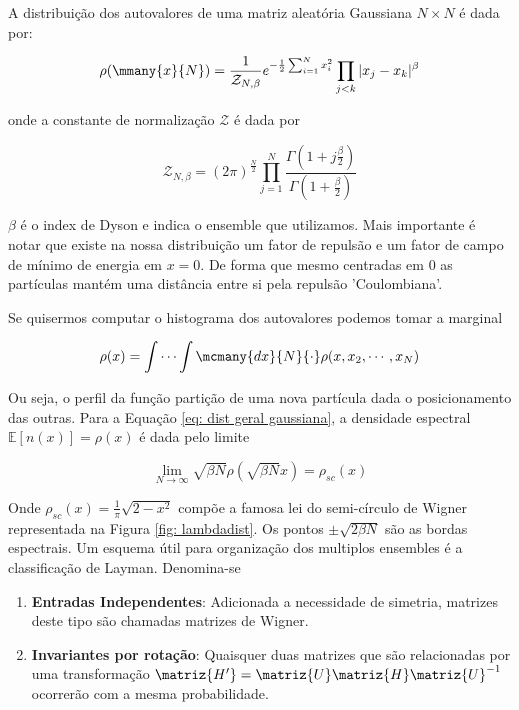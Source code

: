 A distribuição dos autovalores de uma matriz aleatória Gaussiana $N\times N$ é dada por:

\begin{equation}
	\rho(\mmany{x}{N}) = \frac{1}{\mathcal{Z}_{N,\beta}} e^{-\frac{1}{2} \sum_{i=1}^{N} x_i^2} \prod_{j<k} |x_j - x_k|^{\beta}
	\label{eq: dist geral gaussiana}
\end{equation}

onde a constante de normalização $\mathcal{Z}$ é dada por

\begin{equation}
		\mathcal{Z}_{N, \beta} = (2\pi)^{\frac{N}{2}} \prod_{j=1}^{N} \frac{\Gamma (1 + j \frac{\beta}{2})}{\Gamma (1 + \frac{\beta}{2})}
\end{equation}

$\beta$ é o index de Dyson e indica o ensemble que utilizamos. Mais importante é notar que existe na nossa distribuição um fator de repulsão e um fator de campo de mínimo de energia em $x=0$. De forma que mesmo centradas em $0$ as partículas mantém uma distância entre si pela repulsão 'Coulombiana'.

Se quisermos computar o histograma dos autovalores podemos tomar a marginal

\begin{equation}
	\rho(x) = \int \cdots \int \mcmany{dx}{N}{\cdot} \rho(x, x_2, \cdots, x_N)
\end{equation}

Ou seja, o perfil da função partição de uma nova partícula dada o posicionamento das outras. Para a Equação \ref{eq: dist geral gaussiana}, a densidade espectral $\mathbb{E}[n(x)]=\rho(x)$ é dada pelo limite

\begin{equation}
	\lim_{N \rightarrow \infty} \sqrt{\beta N} \rho(\sqrt{\beta N} x) = \rho_{sc}(x)
\end{equation}

Onde $\rho_{sc}(x) = \frac{1}{\pi} \sqrt{2 - x^2}$ compõe a famosa lei do semi-círculo de Wigner representada na Figura \ref{fig: lambdadist}. Os pontos $\pm \sqrt{2 \beta N}$ são as bordas espectrais. Um esquema útil para organização dos multiplos ensembles é a classificação de Layman. Denomina-se

\begin{enumerate}
	\item \textbf{Entradas Independentes}: Adicionada a necessidade de simetria, matrizes deste tipo são chamadas matrizes de Wigner.
	\item \textbf{Invariantes por rotação}: Quaisquer duas matrizes que são relacionadas por uma transformação $\matriz{H'} = \matriz{U} \matriz{H} \matriz{U}^{-1}$ ocorrerão com a mesma probabilidade.
\end{enumerate}

